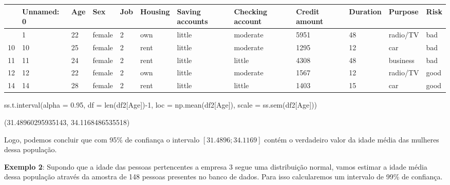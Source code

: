 \documentclass[
  letterpaper,
  DIV=11,
  numbers=noendperiod]{scrreprt}
\newenvironment{Shaded}{\begin{snugshade}}{\end{snugshade}}
\newcommand{\BuiltInTok}[1]{\textcolor[rgb]{0.00,0.23,0.31}{#1}}
\newcommand{\DecValTok}[1]{\textcolor[rgb]{0.68,0.00,0.00}{#1}}
\newcommand{\FloatTok}[1]{\textcolor[rgb]{0.68,0.00,0.00}{#1}}
\newcommand{\NormalTok}[1]{\textcolor[rgb]{0.00,0.23,0.31}{#1}}
\newcommand{\OperatorTok}[1]{\textcolor[rgb]{0.37,0.37,0.37}{#1}}
\newcommand{\StringTok}[1]{\textcolor[rgb]{0.13,0.47,0.30}{#1}}
\begin{document}
\begin{longtable}[]{@{}llllllllllll@{}}
\toprule\noalign{}
& Unnamed: 0 & Age & Sex & Job & Housing & Saving accounts & Checking
account & Credit amount & Duration & Purpose & Risk \\
\midrule\noalign{}
\endhead
\bottomrule\noalign{}
\endlastfoot
1 & 1 & 22 & female & 2 & own & little & moderate & 5951 & 48 & radio/TV
& bad \\
10 & 10 & 25 & female & 2 & rent & little & moderate & 1295 & 12 & car &
bad \\
11 & 11 & 24 & female & 2 & rent & little & little & 4308 & 48 &
business & bad \\
12 & 12 & 22 & female & 2 & own & little & moderate & 1567 & 12 &
radio/TV & good \\
14 & 14 & 28 & female & 2 & rent & little & little & 1403 & 15 & car &
good \\
\end{longtable}

\begin{Shaded}
\begin{Highlighting}[]
\NormalTok{ss.t.interval(alpha }\OperatorTok{=} \FloatTok{0.95}\NormalTok{, df }\OperatorTok{=} \BuiltInTok{len}\NormalTok{(df2[}\StringTok{\textquotesingle{}Age\textquotesingle{}}\NormalTok{])}\OperatorTok{{-}}\DecValTok{1}\NormalTok{, loc }\OperatorTok{=}\NormalTok{ np.mean(df2[}\StringTok{\textquotesingle{}Age\textquotesingle{}}\NormalTok{]), scale }\OperatorTok{=}\NormalTok{ ss.sem(df2[}\StringTok{\textquotesingle{}Age\textquotesingle{}}\NormalTok{]))}
\end{Highlighting}
\end{Shaded}

\begin{tcolorbox}[enhanced jigsaw, breakable, leftrule=.75mm, left=2mm, opacityback=0, bottomrule=.15mm, toprule=.15mm, rightrule=.15mm, arc=.35mm, colback=white]

(31.48960295935143, 34.1168486535518)

\end{tcolorbox}

Logo, podemos concluir que com 95\% de confiança o intervalo
\([31.4896;34.1169]\) contém o verdadeiro valor da idade média das
mulheres dessa população.

\textbf{Exemplo 2}: Supondo que a idade das pessoas pertencentes a
empresa 3 segue uma distribuição normal, vamos estimar a idade média
dessa população através da amostra de 148 pessoas presentes no banco de
dados. Para isso calcularemos um intervalo de 99\% de confiança.
\end{document}
